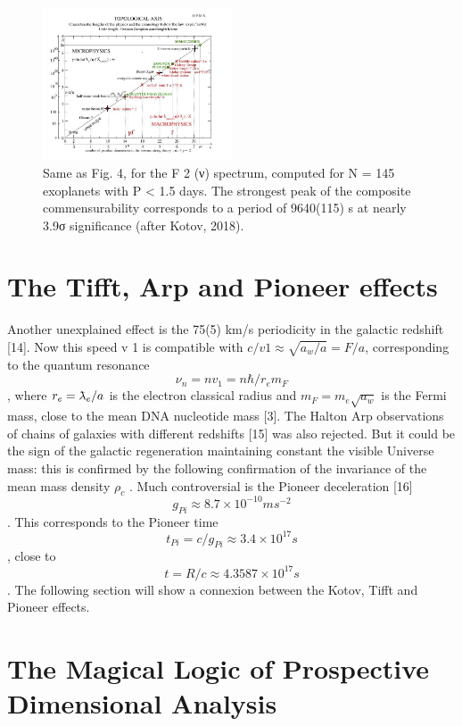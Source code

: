 \begin{figure}
\centering
\includegraphics[width=0.5\textwidth]{./figures/figure}
\caption{Same as Fig. 4, for the F 2 (ν) spectrum, computed for N = 145 exoplanets with P < 1.5
days. The strongest peak of the composite commensurability corresponds to a period of 9640(115) s
at nearly 3.9σ significance (after Kotov, 2018).}
\label{fig:figure_label}
\end{figure}


\section {The Tifft, Arp and Pioneer effects}

Another unexplained effect is the 75(5) km/s periodicity in the galactic redshift [14]. Now this
speed v 1 is compatible with $c/v 1 \approx \sqrt{a_{w} /a} = F/a$, corresponding to the quantum resonance $$\nu_{n} = nv_{1} =n\hbar /r_{e} m_{F} $$, where $r_{e} = \lambdabar_{e} /a$ is the electron classical radius and $m_{F} = m_{e} \sqrt{a_{w}}$ is the Fermi mass, close to the mean DNA nucleotide mass [3].
The Halton Arp observations of chains of galaxies with different redshifts [15] was also
rejected. But it could be the sign of the galactic regeneration maintaining constant the visible
Universe mass: this is confirmed by the following confirmation of the invariance of the mean mass
density $\rho_{c}$ .
Much controversial is the Pioneer deceleration [16] $$g_{Pi} \approx 8.7 \times 10^{-10} ms^{-2}$$ . This corresponds to
the Pioneer time $$t_{Pi} = c/g_{Pi} \approx 3.4 \times 10^{17} s$$, close to $$t = R/c \approx 4.3587 \times 10^{17} s$$. The following section will show a connexion between the Kotov, Tifft and Pioneer effects.

\section {The Magical Logic of Prospective Dimensional Analysis}

